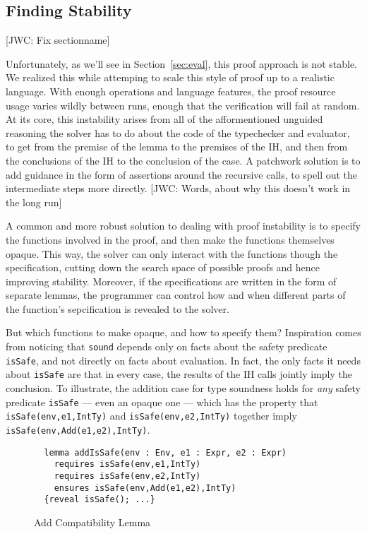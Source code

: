 \documentclass[sigplan,review,screen,anonymous]{acmart}
\newcommand{\comm}[3]{\textcolor{#1}{[#2: #3]}}
\newcommand{\jwc}[1]{\comm{dkgreen}{JWC}{#1}}
\begin{document}
\subsection*{Finding Stability}
\jwc{Fix sectionname}

Unfortunately, as we'll see in Section~\ref{sec:eval}, this proof approach is
not stable. We realized this while attemping to scale this style
of proof up to a realistic language. With enough operations and language
features, the proof resource usage varies wildly between runs,
enough that the verification will fail at random. At its core, this
instability arises from all of the afformentioned unguided reasoning the solver has to do about the
code of the typechecker and evaluator,
to get from the premise of the lemma to the premises of the IH, and then
from the conclusions of the IH to the conclusion of the case.
A patchwork solution is to add guidance in the form of assertions around the
recursive calls, to spell out the intermediate steps more directly.
\jwc{Words, about why this doesn't work in the long run}

A common and more robust solution to dealing with proof instability is to specify
the functions involved in the proof, and then make the functions themselves opaque.
This way, the solver can only interact with the functions though the specification,
cutting down the search space of possible proofs and hence improving stability.
Moreover, if the specifications are written in the form of separate lemmas,
the programmer can control how and when different parts of the function's sepcification
is revealed to the solver.

But which functions to make opaque, and how to specify them?
Inspiration comes from noticing that \texttt{sound} depends only on
facts about the safety predicate \texttt{isSafe}, and not directly
on facts about evaluation. In fact, the only facts it needs about \texttt{isSafe}
are that in every case, the results of the IH calls jointly imply the conclusion.
To illustrate, the addition case for type soundness holds
for \emph{any} safety predicate \texttt{isSafe} --- even an opaque one --- which has the property
that \texttt{isSafe(env,e1,IntTy)} and \texttt{isSafe(env,e2,IntTy)}
together imply \texttt{isSafe(env,Add(e1,e2),IntTy)}.


\begin{figure}
  \begin{verbatim}
  lemma addIsSafe(env : Env, e1 : Expr, e2 : Expr)
    requires isSafe(env,e1,IntTy)
    requires isSafe(env,e2,IntTy)
    ensures isSafe(env,Add(e1,e2),IntTy)
  {reveal isSafe(); ...}
  \end{verbatim}
  \caption{Add Compatibility Lemma}
  \label{fig:add-is-safe}
\end{figure}
\end{document}
